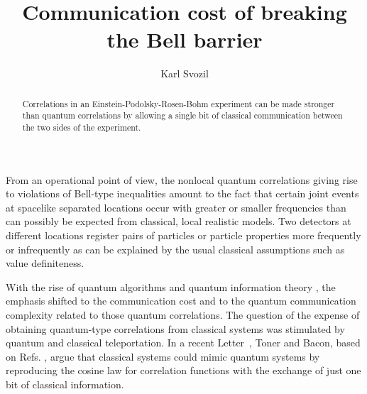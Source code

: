 \documentclass[prl,preprint,amsfonts,showpacs,showkeys]{revtex4}
\begin{document}



\title{Communication cost of breaking the Bell barrier}

\author{Karl Svozil}


\begin{abstract}
Correlations in an Einstein-Podolsky-Rosen-Bohm experiment can be made stronger than quantum correlations by allowing a single bit of classical communication between the two sides of the experiment.
\end{abstract}






\maketitle


From an operational point of view,
the nonlocal quantum correlations giving rise to
violations of Bell-type inequalities amount to the fact that
certain joint events at spacelike separated locations
occur with greater or smaller frequencies than can possibly be
expected from classical, local realistic models.
Two detectors at different locations register pairs
of particles or particle properties
more frequently or infrequently as can be explained by
the usual classical assumptions such as value definiteness.

With the rise of quantum algorithms and quantum information theory
\cite{nielsen-book},
the emphasis shifted to the communication cost and to the quantum communication complexity
related to those quantum correlations.
The question of the expense of obtaining quantum-type correlations
from classical systems was stimulated by quantum
\cite{BBCJPW}
and classical \cite{Brassard-Cleve-Tapp,cerf-gisin-massar-00,cerf-gisin-massar-pop-04,bru-gis-sca-04}
teleportation.
In a recent Letter~\cite{toner-bacon-03}, Toner and Bacon,
based on Refs. \cite{schatten-93,cerf-gisin-massar-00}, argue
that classical systems could mimic quantum systems by reproducing the
cosine law for correlation functions with the exchange of just one bit of classical information.
\end{document}
